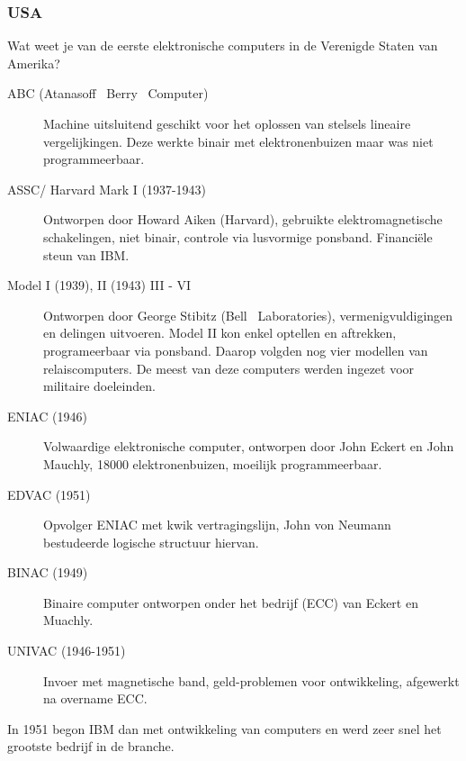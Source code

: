\documentclass[../main.tex]{subfiles}
\begin{document}
\subsubsection{USA}
\begin{question} Wat weet je van de eerste elektronische computers in de Verenigde Staten van Amerika?  \end{question}
\begin{solution}
	\begin{description}
		\item[ABC (Atanasoff  Berry  Computer)]
		Machine uitsluitend geschikt voor het oplossen van stelsels lineaire vergelijkingen. Deze werkte binair met elektronenbuizen maar was niet programmeerbaar.
		\item[ASSC/ Harvard Mark I (1937-1943)]
		Ontworpen door Howard Aiken (Harvard), gebruikte elektromagnetische schakelingen, niet binair, controle via lusvormige ponsband. Financi\"ele steun van IBM.
		\item[Model I (1939), II (1943) III - VI ]
		Ontworpen door George Stibitz (Bell  Laboratories), vermenigvuldigingen en delingen uitvoeren. Model II  kon enkel optellen en aftrekken, programeerbaar via ponsband. Daarop volgden nog vier modellen van relaiscomputers. De meest van deze computers werden ingezet voor militaire doeleinden.
		\item[ENIAC (1946)]
		Volwaardige elektronische computer, ontworpen door John Eckert en John Mauchly, 18000 elektronenbuizen, moeilijk programmeerbaar.
		\item[EDVAC (1951)]
		Opvolger ENIAC met kwik vertragingslijn, John von Neumann bestudeerde logische structuur hiervan.
		\item[BINAC (1949)]
		Binaire computer ontworpen onder het bedrijf (ECC) van Eckert en Muachly.
		\item[UNIVAC (1946-1951)]
		Invoer met magnetische band, geld-problemen voor ontwikkeling, afgewerkt na overname ECC.
	\end{description}
	In 1951 begon IBM dan met ontwikkeling van computers en werd zeer snel het grootste bedrijf in de branche.
\end{solution}
\end{document}
